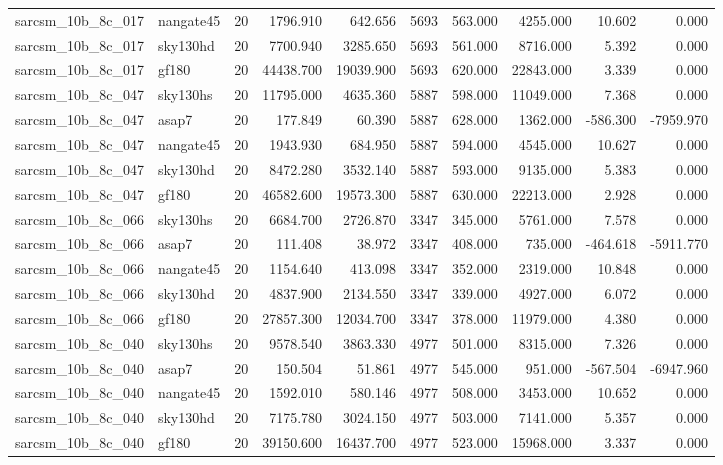 \begin{longtable}{llrrrrrrrr}
sarcsm\_10b\_8c\_017 & nangate45 & 20 & 1796.910 & 642.656 & 5693 & 563.000 & 4255.000 & 10.602 & 0.000 \\
sarcsm\_10b\_8c\_017 & sky130hd & 20 & 7700.940 & 3285.650 & 5693 & 561.000 & 8716.000 & 5.392 & 0.000 \\
sarcsm\_10b\_8c\_017 & gf180 & 20 & 44438.700 & 19039.900 & 5693 & 620.000 & 22843.000 & 3.339 & 0.000 \\
sarcsm\_10b\_8c\_047 & sky130hs & 20 & 11795.000 & 4635.360 & 5887 & 598.000 & 11049.000 & 7.368 & 0.000 \\
sarcsm\_10b\_8c\_047 & asap7 & 20 & 177.849 & 60.390 & 5887 & 628.000 & 1362.000 & -586.300 & -7959.970 \\
sarcsm\_10b\_8c\_047 & nangate45 & 20 & 1943.930 & 684.950 & 5887 & 594.000 & 4545.000 & 10.627 & 0.000 \\
sarcsm\_10b\_8c\_047 & sky130hd & 20 & 8472.280 & 3532.140 & 5887 & 593.000 & 9135.000 & 5.383 & 0.000 \\
sarcsm\_10b\_8c\_047 & gf180 & 20 & 46582.600 & 19573.300 & 5887 & 630.000 & 22213.000 & 2.928 & 0.000 \\
sarcsm\_10b\_8c\_066 & sky130hs & 20 & 6684.700 & 2726.870 & 3347 & 345.000 & 5761.000 & 7.578 & 0.000 \\
sarcsm\_10b\_8c\_066 & asap7 & 20 & 111.408 & 38.972 & 3347 & 408.000 & 735.000 & -464.618 & -5911.770 \\
sarcsm\_10b\_8c\_066 & nangate45 & 20 & 1154.640 & 413.098 & 3347 & 352.000 & 2319.000 & 10.848 & 0.000 \\
sarcsm\_10b\_8c\_066 & sky130hd & 20 & 4837.900 & 2134.550 & 3347 & 339.000 & 4927.000 & 6.072 & 0.000 \\
sarcsm\_10b\_8c\_066 & gf180 & 20 & 27857.300 & 12034.700 & 3347 & 378.000 & 11979.000 & 4.380 & 0.000 \\
sarcsm\_10b\_8c\_040 & sky130hs & 20 & 9578.540 & 3863.330 & 4977 & 501.000 & 8315.000 & 7.326 & 0.000 \\
sarcsm\_10b\_8c\_040 & asap7 & 20 & 150.504 & 51.861 & 4977 & 545.000 & 951.000 & -567.504 & -6947.960 \\
sarcsm\_10b\_8c\_040 & nangate45 & 20 & 1592.010 & 580.146 & 4977 & 508.000 & 3453.000 & 10.652 & 0.000 \\
sarcsm\_10b\_8c\_040 & sky130hd & 20 & 7175.780 & 3024.150 & 4977 & 503.000 & 7141.000 & 5.357 & 0.000 \\
sarcsm\_10b\_8c\_040 & gf180 & 20 & 39150.600 & 16437.700 & 4977 & 523.000 & 15968.000 & 3.337 & 0.000 \\

\end{longtable}
